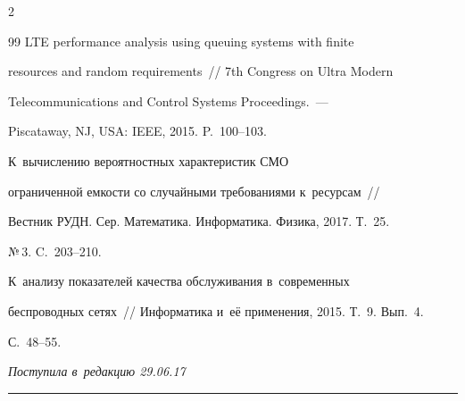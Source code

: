\begin{multicols}{2}
{{\begin{thebibliography}{99}
 LTE performance analysis using queuing systems with finite 

resources and random requirements~// 7th Congress on Ultra Modern 

Telecommunications and Control Systems Proceedings.~--- 

Piscataway, NJ, USA: IEEE, 2015. P.~100--103.


 К~вычислению вероятностных характеристик СМО 

ограниченной емкости со случайными требованиями к~ресурсам~// 

Вестник РУДН. Сер. Математика. Информатика. Физика, 2017. Т.~25. 

№\,3. C.~203--210.



К~анализу показателей качества обслуживания в~современных 

беспроводных сетях~// Информатика и~её применения, 2015. Т.~9. Вып.~4. 

С.~48--55. 

 \end{thebibliography}



 }

 }



\end{multicols}



\vspace*{-3pt}



\hfill{\small\textit{Поступила в~редакцию 29.06.17}}



\vspace*{8pt}









\hrule



\vspace*{2pt}



